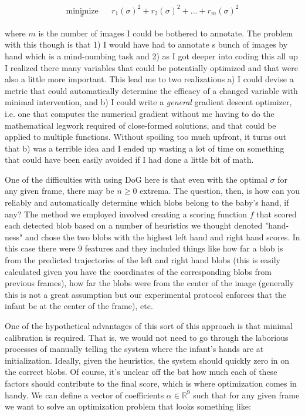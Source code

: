 \documentclass[11pt]{article}
\begin{document}
\begin{equation*}
\begin{aligned}
\underset{\sigma}{\text{minimize}}
& & r_{1}(\sigma)^{2} +  r_{2}(\sigma)^{2} + ... + r_{m}(\sigma)^{2}

\end{aligned}
\end{equation*}

where \(m\) is the number of images I could be bothered to annotate. The problem with this though is that 1) I would have had to annotate s bunch of images by hand which is a mind-numbing task and 2) as I got deeper into coding this all up I realized there many variables that could be potentially optimized and that were also a little more important. This lead me to two realizations a) I could devise a metric that could automatically determine the efficacy of a changed variable with minimal intervention, and b) I could write a \emph{general} gradient descent optimizer, i.e. one that computes the numerical gradient without me having to do the mathematical legwork required of close-formed solutions, and that could be applied to multiple functions. Without spoiling too much upfront, it turns out that b) was a terrible idea and I ended up wasting a lot of time on something that could have been easily avoided if I had done a little bit of math.

One of the difficulties with using DoG here is that even with the optimal \(\sigma\) for any given frame, there may be \(n \geq 0\) extrema. The question, then, is how can you reliably and automatically determine which blobs belong to the baby's hand, if any? The method we employed involved creating a scoring function \(f\) that scored each detected blob based on a number of heuristics we thought denoted "hand-ness" and chose the two blobs with the highest left hand and right hand scores. In this case there were \(9\) features and they included things like how far a blob is from the predicted trajectories of the left and right hand blobs (this is easily calculated given you have the coordinates of the corresponding blobs from previous frames), how far the blobs were from the center of the image (generally this is not a great assumption but our experimental protocol enforces that the infant be at the center of the frame), etc. 

One of the hypothetical advantages of this sort of this approach is that minimal calibration is required. That is, we would not need to go through the laborious processes of manually telling the system where the infant's hands are at initialization. Ideally, given the heuristics, the system should quickly zero in on the correct blobs. Of course, it's unclear off the bat how much each of these factors should contribute to the final score, which is where optimization comes in handy. We can define a vector of coefficients \(\alpha \in \mathbb{R}^{9}\) such that for any given frame we want to solve an optimization problem that looks something like:
\end{document}
